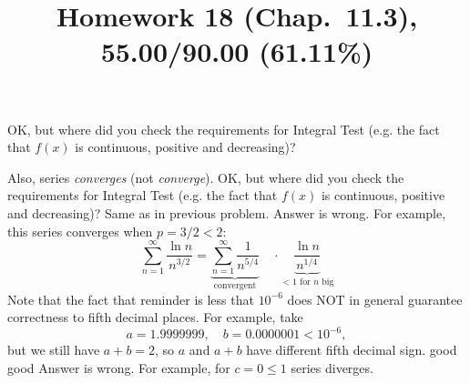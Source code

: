 \documentclass[10pt]{article} %
\title{Homework 18 (Chap.~11.3),
55.00/90.00 (61.11\%)
}
\begin{document}
\maketitle
OK, but where did you check the requirements for Integral Test (e.g. the fact that $f(x)$ is continuous, positive
and decreasing)?

Also, series \textit{converges} (not \textit{converge}).
OK, but where did you check the requirements for Integral Test (e.g. the fact that $f(x)$ is continuous, positive
and decreasing)?
Same as in previous problem.
Answer is wrong. For example, this series converges when $p=3/2<2$:
\begin{equation*}
	\sum_{n=1}^\infty \frac{\ln n}{n^{3/2}}=
	\underbrace{\sum_{n=1}^\infty \frac{1}{n^{5/4}}}_{\mbox{convergent}} 
	\quad\cdot\underbrace{\frac{\ln n}{n^{1/4}}}_{
		\mbox{$<1$ for $n$ big}}
\end{equation*}
Note that the fact that reminder is less that $10^{-6}$ does NOT in general guarantee correctness to fifth decimal
places. For example, take\begin{equation*}
	a=1.9999999,\quad b=0.0000001<10^{-6},
\end{equation*}
but we still have $a+b=2$, so $a$ and $a+b$ have different fifth decimal sign.
good
good
Answer is wrong. For example, for $c=0\le1$ series diverges.
\end{document}
